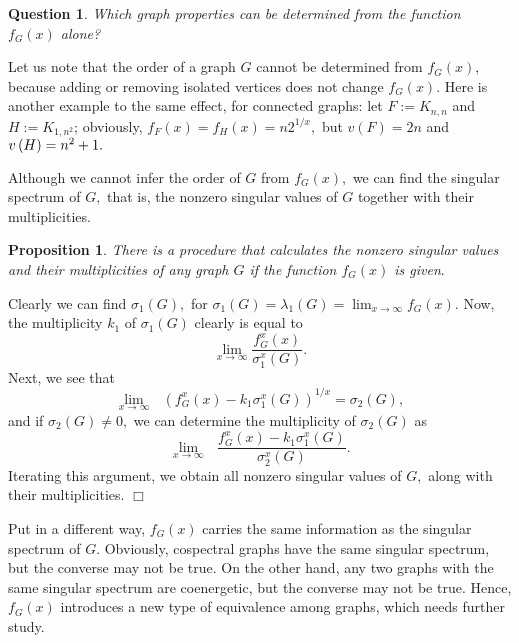 \documentclass[12pt]{article}%
\newtheorem{proposition}[theorem]{Proposition}
\newtheorem{question}[theorem]{Question}
\newenvironment{proof}[1][Proof]{\noindent{\textbf {#1}  }}  {\hfill$\Box$\bigskip}
\begin{document}
\begin{question}
\label{pr1}Which graph properties can be determined from the function
$f_{G}\left(  x\right)  $ alone?
\end{question}

Let us note that the order of a graph $G$ cannot be determined from
$f_{G}\left(  x\right)  $, because adding or removing isolated vertices does
not change $f_{G}\left(  x\right)  .$ Here is another example to the same
effect, for connected graphs: let $F:=K_{n,n}$ and $H:=K_{1,n^{2}}$;
obviously, $f_{F}\left(  x\right)  =f_{H}\left(  x\right)  =n2^{1/x},$ but
$v\left(  F\right)  =2n$ and $v\left(  H\right)  =n^{2}+1.\medskip$

Although we cannot infer the order of $G$ from $f_{G}\left(  x\right)  ,$ we
can find the singular spectrum of $G,$ that is, the nonzero singular values of
$G$ together with their multiplicities.

\begin{proposition}
\label{pro5}There is a procedure that calculates the nonzero singular values
and their multiplicities of any graph $G$ if the function $f_{G}\left(
x\right)  $ is given$.$
\end{proposition}

\begin{proof}
Clearly we can find $\sigma_{1}\left(  G\right)  ,$ for $\sigma_{1}\left(
G\right)  =\lambda_{1}\left(  G\right)  =\lim_{x\rightarrow\infty}f_{G}\left(
x\right)  .$ Now, the multiplicity $k_{1}$ of $\sigma_{1}\left(  G\right)  $
clearly is equal to%
\[
\lim_{x\rightarrow\infty}\frac{f_{G}^{x}\left(  x\right)  }{\sigma_{1}%
^{x}\left(  G\right)  }.
\]
Next, we see that
\[
\lim_{x\rightarrow\infty}\text{ }\left(  f_{G}^{x}\left(  x\right)
-k_{1}\sigma_{1}^{x}\left(  G\right)  \right)  ^{1/x}=\sigma_{2}\left(
G\right)  ,
\]
and if $\sigma_{2}\left(  G\right)  \neq0,$ we can determine the multiplicity
of $\sigma_{2}\left(  G\right)  $ as%
\[
\lim_{x\rightarrow\infty}\text{ }\frac{f_{G}^{x}\left(  x\right)  -k_{1}%
\sigma_{1}^{x}\left(  G\right)  }{\sigma_{2}^{x}\left(  G\right)  }.
\]
Iterating this argument, we obtain all nonzero singular values of $G,$ along
with their multiplicities.
\end{proof}

Put in a different way, $f_{G}\left(  x\right)  $ carries the same information
as the singular spectrum of $G.$ Obviously, cospectral graphs have the same
singular spectrum, but the converse may not be true. On the other hand, any
two graphs with the same singular spectrum are coenergetic, but the converse
may not be true. Hence, $f_{G}\left(  x\right)  $ introduces a new type of
equivalence among graphs, which needs further study.
\end{document}

